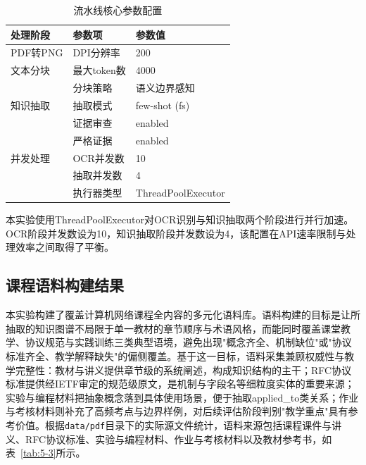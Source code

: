 \begin{table}[ht]
    \centering
    \caption{流水线核心参数配置}
    \label{tab:5-2}
    \begin{tabular}{llp{6cm}}
    \toprule
    \textbf{处理阶段} & \textbf{参数项} & \textbf{参数值} \\
    \midrule
    PDF转PNG & DPI分辨率 & 200 \\
    \midrule
    文本分块 & 最大token数 & 4000 \\
    & 分块策略 & 语义边界感知 \\
    \midrule
    知识抽取 & 抽取模式 & few-shot (fs) \\
    & 证据审查 & enabled \\
    & 严格证据 & enabled \\
    \midrule
    并发处理 & OCR并发数 & 10 \\
    & 抽取并发数 & 4 \\
    & 执行器类型 & ThreadPoolExecutor \\
    \bottomrule
    \end{tabular}
\end{table}

本实验使用ThreadPoolExecutor对OCR识别与知识抽取两个阶段进行并行加速。OCR阶段并发数设为10，知识抽取阶段并发数设为4，该配置在API速率限制与处理效率之间取得了平衡。

\subsection{课程语料构建结果}

本实验构建了覆盖计算机网络课程全内容的多元化语料库。语料构建的目标是让所抽取的知识图谱不局限于单一教材的章节顺序与术语风格，而能同时覆盖课堂教学、协议规范与实践训练三类典型语境，避免出现"概念齐全、机制缺位"或"协议标准齐全、教学解释缺失"的偏侧覆盖。基于这一目标，语料采集兼顾权威性与教学完整性：教材与讲义提供章节级的系统阐述，构成知识结构的主干；RFC协议标准提供经IETF审定的规范级原文，是机制与字段名等细粒度实体的重要来源；实验与编程材料把抽象概念落到具体使用场景，便于抽取applied\_to类关系；作业与考核材料则补充了高频考点与边界样例，对后续评估阶段判别"教学重点"具有参考价值。根据\texttt{data/pdf}目录下的实际源文件统计，语料来源包括课程课件与讲义、RFC协议标准、实验与编程材料、作业与考核材料以及教材参考书，如表~\ref{tab:5-3}所示。

